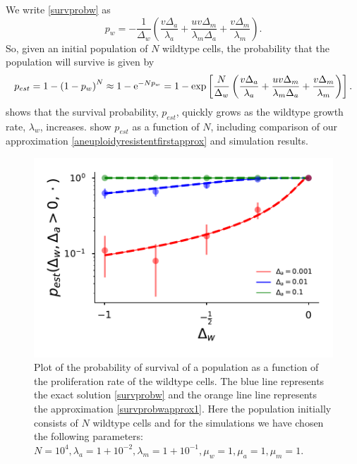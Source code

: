 \documentclass[12pt]{extarticle}
\newcommand{\e}{{\rm e}}
\begin{document}
We write \cref{survprobw} as
\begin{equation}\label{survprobwapprox1}
p_w=-\frac{1}{\Delta_w}\left(\frac{v\Delta_a}{\lambda_a}+\frac{uv\Delta_m}{\lambda_m\Delta_a}+\frac{v\Delta_m}{\lambda_m}\right).
\end{equation}
So, given an initial population of $N$ wildtype cells, the probability that the population will survive is given by
\begin{align}\label{aneuploidyresistentfirstapprox}
p_{est}=1-\left(1-p_w\right)^N\approx 1-\e^{-Np_w}=1-\exp\left[\frac{N}{\Delta_w}\left(\frac{v\Delta_a}{\lambda_a}+\frac{uv\Delta_m}{\lambda_m\Delta_a}+\frac{v\Delta_m}{\lambda_m}\right)\right] .
\end{align}
 shows that the survival probability, $p_{est}$, quickly grows as the wildtype growth rate, $\lambda_w$, increases. %
 show $p_{est}$ as a function of $N$, including comparison of our approximation \eqref{aneuploidyresistentfirstapprox} %
and simulation results.

\begin{figure}[!t]
 \vspace*{1\baselineskip}
\includegraphics[width=1\textwidth]{Figures/P_est_growth.pdf}
\caption{Plot of the probability of survival of a population as a function of the proliferation rate of the wildtype cells. The blue line represents the exact solution \eqref{survprobw} and the orange line line represents the approximation \eqref{survprobwapprox1}. Here the population initially consists of $N$ wildtype cells and for the simulations we have chosen the following parameters: $N=10^4, \lambda_a=1+10^{-2},\lambda_m=1+10^{-1},\mu_w=1,\mu_a=1,\mu_m=1.$}
\label{SurvPlot}
\end{figure}
\end{document}
